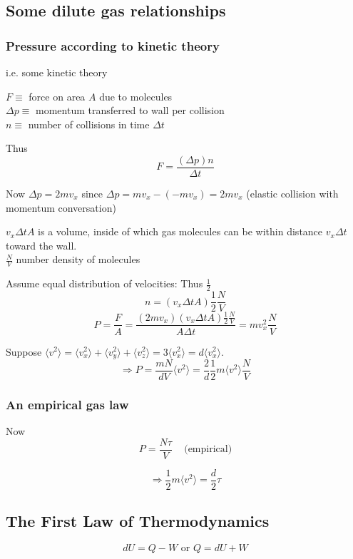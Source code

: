 \documentclass[10pt]{amsart}
\begin{document}
\begin{multicols*}{2}
\subsection{Some dilute gas relationships}

\subsubsection*{Pressure according to kinetic theory} i.e. some kinetic theory

$F \equiv $ force on area $A$ due to molecules \\
$\Delta p \equiv $ momentum transferred to wall per collision \\
$n \equiv$ number of collisions in time $\Delta t$

Thus
\[
F = \frac{ (\Delta p)n }{ \Delta t }
\]

Now $\Delta p = 2 m v_x$ since $\Delta p = mv_x - (-mv_x) = 2mv_x$ (elastic collision with momentum conversation)

$v_x \Delta t A$ is a volume, inside of which gas molecules can be within distance $v_x \Delta t$ toward the wall.  \\
$\frac{N}{V}$ number density of molecules

Assume equal distribution of velocities: Thus $\frac{1}{2}$
\[
 n = (v_x \Delta t A) \frac{1}{2} \frac{N}{V}
\]
\[
P = \frac{F}{A} = \frac{ (2mv_x)(v_x \Delta t A ) \frac{1}{2} \frac{N}{V} }{ A \Delta t} = mv_x^2 \frac{N}{V}
\]

Suppose $\langle v^2 \rangle = \langle v_x^2 \rangle + \langle v_y^2 \rangle + \langle v_z^2 \rangle = 3 \langle v_x^2 \rangle = d \langle v_x^2 \rangle$.  
\[
\Longrightarrow P = \frac{mN}{dV} \langle v^2 \rangle = \frac{2}{d} \frac{1}{2} m \langle v^2 \rangle \frac{N}{V}
\]

\subsubsection*{An empirical gas law}
Now 
\[
P = \frac{N\tau}{V} \quad \, \text{(empirical)}
\]

\[
\Longrightarrow \frac{1}{2} m \langle v^2 \rangle = \frac{d}{2} \tau
\]

\subsection{The First Law of Thermodynamics}

\[
dU = Q - W \text{ or } Q = dU + W 
\]


\end{multicols*}
\end{document}
